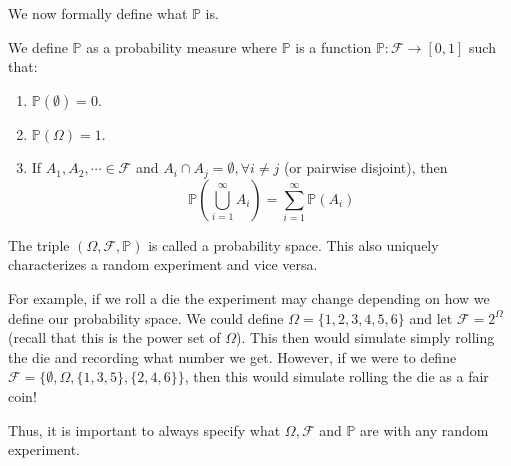 \documentclass[notitlepage,abstract=on,twoside=semi]{scrartcl}
\newcommand{\om}{\ensuremath{\Omega}}
\newcommand{\F}{\ensuremath{\mathcal{F}}}
\newcommand{\Prob}{\ensuremath{\mathbb{P}}}
\begin{document}
We now formally define what $\Prob$ is.
\begin{definition}
  \label{2:3}
  We define $\Prob$ as a probability measure where $\Prob$ is a function $\Prob
  : \F \to [0,1]$ such that:
  \begin{enumerate}
  \item $\Prob(\emptyset) = 0$.
  \item $\Prob(\Omega) = 1$.
  \item If $A_{1}, A_{2}, \cdots \in \F$ and $A_{i} \cap A_{j} = \emptyset,
    \forall i \neq j$ (or pairwise disjoint), then
    \[
      \Prob(\bigcup_{i=1}^{\infty}A_{i}) = \sum_{i=1}^{\infty}\Prob(A_{i})
    \]
  \end{enumerate}
\end{definition}
\begin{remark}
  \label{2:4}
  The triple $(\om, \F, \Prob)$ is called a probability space. This also
  uniquely characterizes a random experiment and vice versa.

  For example, if we roll a die the experiment may change depending on how we
  define our probability space. We could define $\om = \{1, 2, 3, 4, 5, 6\}$
  and let $\F = 2^{\om}$ (recall that this is the power set of $\om$). This
  then would simulate simply rolling the die and recording what number we
  get. However, if we were to define $\F = \{\emptyset, \om, \{1, 3, 5\}, \{2,
  4, 6\}\}$, then this would simulate rolling the die as a fair coin!

  Thus, it is important to always specify what $\om, \F$ and $\Prob$ are with
  any random experiment.
\end{remark}
\end{document}
